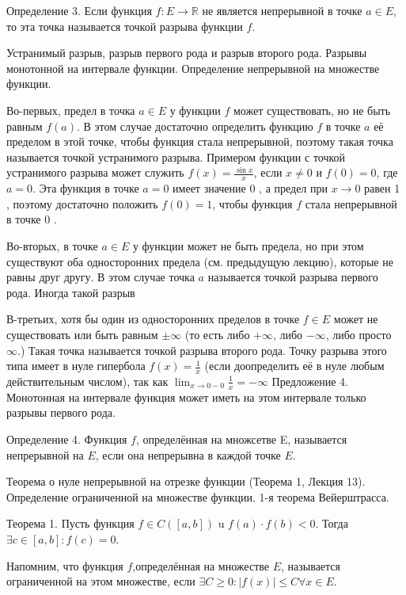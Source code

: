 Определение 3. Если функция $f: E \rightarrow \mathbb{R}$ не является непрерывной в точке $a \in E$, то эта точка называется точкой разрыва функции $f$.

\newpage
\begin{problem}
Устранимый разрыв, разрыв первого рода и разрыв второго рода. Разрывы монотонной
на интервале функции. Определение непрерывной на множестве функции.
\end{problem}
Во-первых, предел в точка $a \in E$ у функции $f$ может существовать, но не быть равным $f(a)$. В этом случае достаточно определить функцию $f$ в точке $a$ её пределом в этой точке, чтобы функция стала непрерывной, поэтому такая точка называется точкой устранимого разрыва. Примером функции с точкой устранимого разрыва может служить $f(x)=\frac{\sin x}{x}$, если $x \neq 0$ и $f(0)=0$, где $a=0$. Эта функция в точке $a=0$ имеет значение 0 , а предел при $x \rightarrow 0$ равен 1 , поэтому достаточно положить $f(0)=1$, чтобы функция $f$ стала непрерывной в точке 0 .

Во-вторых, в точке $a \in E$ у функции может не быть предела, но при этом существуют оба односторонних предела (см. предыдущую лекцию), которые не равны друг другу. В этом случае точка $a$ называется точкой разрыва первого рода. Иногда такой разрыв

В-третьих, хотя бы один из односторонних пределов в точке $f \in E$ может не существовать или быть равным $\pm \infty$ (то есть либо $+\infty$, либо $-\infty$, либо просто $\infty$.) Такая точка называется точкой разрыва второго рода. Точку разрыва этого типа имеет в нуле гипербола $f(x)=\frac{1}{x}$ (если доопределить её в нуле любым действительным числом), так как $\lim _{x \rightarrow 0-0} \frac{1}{x}=-\infty$
Предложение 4. Монотонная на интервале функция может иметь на этом интервале только разрывы первого рода.

Определение 4. Функция $f$, определённая на множсетве E, называется непрерывной на $E$, если она непрерывна в каждой точке $E$.

\newpage
\begin{problem}
Теорема о нуле непрерывной на отрезке функции (Теорема 1, Лекция 13). Определение
ограниченной на множестве функции. 1-я теорема Вейерштрасса.
\end{problem}
Теорема 1. Пусть функция $f \in C([a, b])$ u $f(a) \cdot f(b)<0$. Тогда $\exists c \in[a, b]: f(c)=0$.

Напомним, что функция $f$,определённая на множестве $E$, называется ограниченной на этом множестве, если $\exists C \geq 0:|f(x)| \leq C \forall x \in E$.

